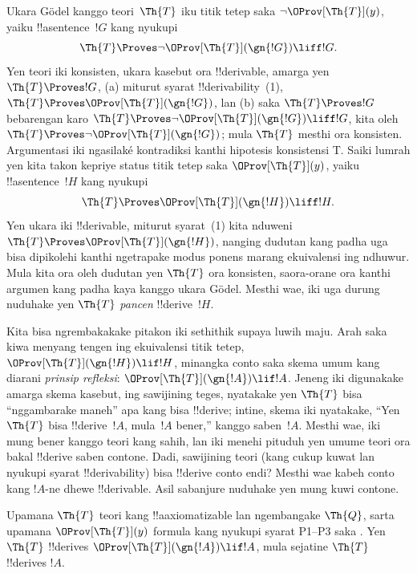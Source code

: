 \documentclass[../../../include/open-logic-section]{subfiles}
\begin{document}


Ukara G\"odel kanggo teori~$\Th{T}$ iku titik tetep saka $\lnot
\OProv[\Th{T}](y)$, yaiku !!a{sentence}~$!G$ kang nyukupi
\[
\Th{T} \Proves \lnot \OProv[\Th{T}](\gn{!G}) \liff !G.
\]
Yen teori iki konsisten, ukara kasebut ora !!{derivable}, amarga
yen $\Th{T} \Proves !G$, (a) miturut
syarat !!{derivability}~(1), $\Th{T} \Proves \OProv[\Th{T}](\gn{!G})$,
lan (b) saka $\Th{T} \Proves !G$ bebarengan karo $\Th{T} \Proves
\lnot \OProv[\Th{T}](\gn{!G}) \liff !G$, kita oleh $\Th{T} \Proves
\lnot \OProv[\Th{T}](\gn{!G})$; mula $\Th{T}$ mesthi ora konsisten. Argumentasi iki ngasilaké kontradiksi kanthi hipotesis konsistensi T.
Saiki lumrah yen kita takon kepriye status titik tetep saka
$\OProv[\Th{T}](y)$, yaiku !!a{sentence}~$!H$ kang nyukupi
\[
\Th{T} \Proves \OProv[\Th{T}](\gn{!H}) \liff !H.
\]
Yen ukara iki !!{derivable}, miturut syarat~(1) kita nduweni
$\Th{T} \Proves \OProv[\Th{T}](\gn{!H})$, nanging dudutan kang padha
uga bisa dipikolehi kanthi ngetrapake modus ponens marang ekuivalensi
ing ndhuwur. Mula kita ora oleh dudutan yen $\Th{T}$ ora konsisten,
saora-orane ora kanthi argumen kang padha kaya kanggo ukara G\"odel.
Mesthi wae, iki uga durung nuduhake yen $\Th{T}$ \emph{pancen}
!!{derive}~$!H$.

Kita bisa ngrembakakake pitakon iki sethithik supaya luwih maju.
Arah saka kiwa menyang tengen ing ekuivalensi titik tetep,
$\OProv[\Th{T}](\gn{!H}) \lif !H$, minangka conto saka skema umum
kang diarani \emph{prinsip refleksi}:
$\OProv[\Th{T}](\gn{!A}) \lif !A$.
Jeneng iki digunakake amarga skema kasebut, ing sawijining teges,
nyatakake yen $\Th{T}$ bisa ``nggambarake maneh'' apa kang bisa
!!{derive}; intine, skema iki nyatakake,
``Yen $\Th{T}$ bisa !!{derive}~$!A$, mula~$!A$ bener,''
kanggo saben~$!A$.
Mesthi wae, iki mung bener kanggo teori kang sahih, lan iki menehi
pituduh yen umume teori ora bakal !!{derive} saben contone.
Dadi, sawijining teori (kang cukup kuwat lan nyukupi syarat
!!{derivability}) bisa !!{derive} conto endi?
Mesthi wae kabeh conto kang $!A$-ne dhewe !!{derivable}.
Asil sabanjure nuduhake yen mung kuwi contone.

\begin{thm}
Upamana $\Th{T}$ teori kang !!a{axiomatizable} lan ngembangake
$\Th{Q}$, sarta upamana $\OProv[\Th{T}](y)$ formula kang nyukupi
syarat P1--P3 saka . Yen $\Th{T}$ !!{derive}s
$\OProv[\Th{T}](\gn{!A}) \lif !A$, mula sejatine $\Th{T}$
!!{derive}s $!A$.
\end{thm}
\end{document}
